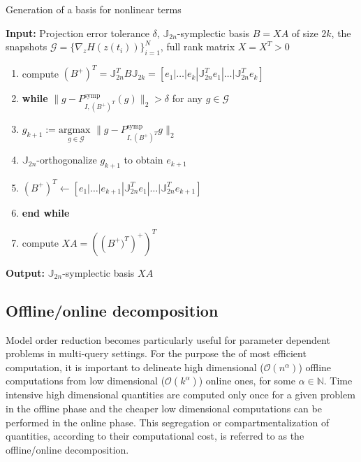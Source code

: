 {\begin{algorithm} 
\caption{Generation of a basis for nonlinear terms} \label{alg:3}
{\bf Input:} Projection error tolerance $\delta$, $\mathbb J_{2n}$-symplectic basis $B = X A$ of size $2k$, the snapshots $\mathcal G = \{ \nabla_zH(z(t_i))\}_{i=1}^{N}$, full rank matrix $X=X^T>0$
\begin{enumerate}
\item compute $(B^+)^T = \mathbb J_{2n}^T B \mathbb J_{2k} = [e_1|\dots |e_{k} | \mathbb J_{2n}^Te_1|\dots| \mathbb J_{2n}^Te_{k}]$
\item \textbf{while} $\| g - P_{I,(B^+)^T}^{\text{symp}} (g) \|_2 > \delta$ for any $g \in \mathcal G$
\item \hspace{0.5cm} $g_{k+1} := \underset{g\in \mathcal G}{\text{argmax }} \| g -  P_{I,(B^+)^T}^{\text{symp}} g  \|_2$
\item \hspace{0.5cm} $\mathbb J_{2n}$-orthogonalize $g_{k+1}$ to obtain $e_{k+1}$
\item \hspace{0.5cm} $(B^+)^T \leftarrow [e_1|\dots |e_{k+1} | \mathbb J_{2n}^Te_1|\dots| \mathbb J_{2n}^Te_{k+1}]$
\item \textbf{end while}
\item compute $XA = \left( \left (B^+)^T \right)^+ \right)^T$
\end{enumerate}
\vspace{0.5cm}
{\bf Output:} $\mathbb J_{2n}$-symplectic basis $XA$
\end{algorithm}
}


\subsection{Offline/online decomposition} \label{sec:normmor.4}
Model order reduction becomes particularly useful for parameter dependent problems in multi-query settings. For the purpose the of most efficient computation, it is important to delineate high dimensional ($\mathcal{O}(n^{\alpha})$) offline computations from low dimensional ($\mathcal{O}(k^{\alpha})$) online ones, for some $\alpha \in \mathbb N$. Time intensive high dimensional quantities are computed only once for a given problem in the offline phase and the cheaper low dimensional computations can be performed in the online phase. This segregation or compartmentalization of quantities, according to their computational cost, is referred to as the offline/online decomposition.

